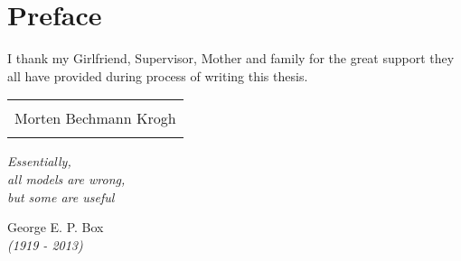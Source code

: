 \chapter*{Preface}
I thank my Girlfriend, Supervisor, Mother and family for the great support they all have provided during process of writing this thesis.




\vspace{10cm}



\begin{table}
	\centering
		\begin{tabular}{c}
			\\
			\underline{\phantom{mmmmmmmmmmmmmmmmmmmmmmmmmmmmmmmmmmmmmmmmm}}  \\
			Morten Bechmann Krogh  \\
			\\
		\end{tabular}
\end{table}

\cleardoublepage

\begin{flushright}
\small\em{
\vspace{5cm}
Essentially, \\
all models are wrong,\\
but some are useful
}
\end{flushright}
\begin{flushright}
\small{
George E. P. Box \\
\em{(1919 - 2013)}
}
\end{flushright}
